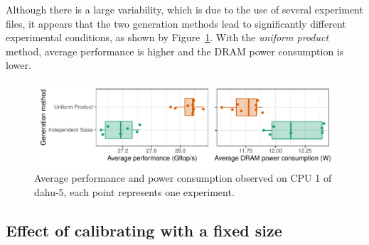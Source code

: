             Although there is a large variability, which is due to the use of several experiment files, it appears that
            the two generation methods lead to significantly different experimental conditions, as shown by
            Figure~\ref{fig:randomizing_sizes:expfile:method}. With the \emph{uniform product} method, \dgemm average
            performance is higher and the DRAM power consumption is lower.

            \begin{figure}[htpb]
                \centering
                \includegraphics[width=\linewidth]{img/experiment/randomizing_sizes/method/average.pdf}
                \caption{Average \dgemm performance and power consumption observed on CPU 1 of dahu-5, each point
                represents one experiment.}%
                \label{fig:randomizing_sizes:expfile:method}
            \end{figure}


        \subsection{Effect of calibrating with a fixed size}%
        \label{sub:fixed_size}

